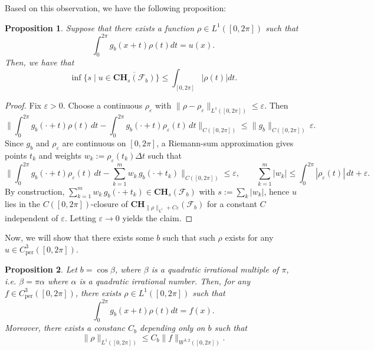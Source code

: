 \documentclass[12pt]{amsart}
\numberwithin{equation}{section}
\newtheorem{proposition}{Proposition}[section]
\theoremstyle{remark}
\begin{document}
Based on this observation, we have the following proposition:
\begin{proposition}
    Suppose that there exists a function $\rho\in L^1([0,2\pi])$ such that
        \begin{equation}
        \int_0^{2\pi} g_b(x+t)\rho(t) dt = u(x).
    \end{equation}
    Then, we have that
    \begin{equation}
        \inf\{s\mid u\in \overline{\mathbf{CH}_s(\mathcal F_{b})}\}\le \int_{[0, 2\pi]} |\rho(t)| dt.
    \end{equation}
\end{proposition}
\begin{proof}
Fix $\varepsilon>0$. Choose a continuous $\rho_\varepsilon$ with $\|\rho-\rho_\varepsilon\|_{L^1([0,2\pi])}\le \varepsilon$.
Then
\begin{equation}
\Big\|\int_0^{2\pi} g_b(\cdot+t)\rho(t)\,dt-\int_0^{2\pi} g_b(\cdot+t)\rho_\varepsilon(t)\,dt\Big\|_{C([0,2\pi])}
\le \|g_b\|_{C([0,2\pi])}\,\varepsilon.
\end{equation}
Since $g_b$ and $\rho_\varepsilon$ are continuous on $[0,2\pi]$, a Riemann-sum approximation gives points $t_k$ and weights
$w_k:=\rho_\varepsilon(t_k)\Delta t$ such that
\begin{equation}
\Big\|\int_0^{2\pi} g_b(\cdot+t)\rho_\varepsilon(t)\,dt-\sum_{k=1}^m w_k\, g_b(\cdot+t_k)\Big\|_{C([0,2\pi])}
\le \varepsilon,
\qquad
\sum_{k=1}^m |w_k|
\le \int_0^{2\pi}|\rho_\varepsilon(t)|\,dt+\varepsilon.
\end{equation}
By construction, $\sum_{k=1}^m w_k\, g_b(\cdot+t_k)\in \mathbf{CH}_s(\mathcal F_b)$ with
$s:=\sum_k|w_k|$, hence $u$ lies in the $C([0,2\pi])$-closure of $\mathbf{CH}_{\|\rho\|_{L^1}+C\varepsilon}(\mathcal F_b)$ for a constant $C$ independent of $\varepsilon$.
Letting $\varepsilon\to 0$ yields the claim.
\end{proof}

Now, we will show that there exists some $b$ such that such $\rho$ exists for any $u\in C_{\text{per}}^3([0,2\pi])$.
\begin{proposition}
    Let $b = \cos \beta$, where $\beta$ is a quadratic irrational multiple of $\pi$, i.e. $\beta = \pi \alpha$ where $\alpha$ is a quadratic irrational number. Then, for any $f\in C_{\text{per}}^3([0,2\pi])$, there exists $\rho\in L^1([0,2\pi])$ such that
\begin{equation}
    \int_0^{2\pi} g_b(x+t)\rho(t) dt = f(x).
\end{equation}
Moreover, there exists a constanc $C_b$ depending only on $b$ such that
\begin{equation}
    \|\rho\|_{L^1([0,2\pi])} \le C_b \|f\|_{W^{3,2}([0,2\pi])}.
\end{equation}
\end{proposition}
\end{document}
